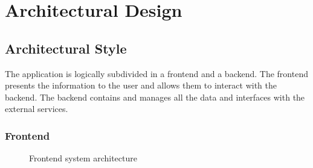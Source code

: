 \documentclass{article}
\begin{document}
\section{Architectural Design}
\subsection{Architectural Style}
The application is logically subdivided in a frontend and a backend.
The frontend presents the information to the user and allows them to interact
with the backend. The backend contains and manages all the data and interfaces
with the external services.
\subsubsection{Frontend}

\begin{figure}[H]
	\noindent
	\caption{Frontend system architecture} 
\end{figure}
\end{document}
